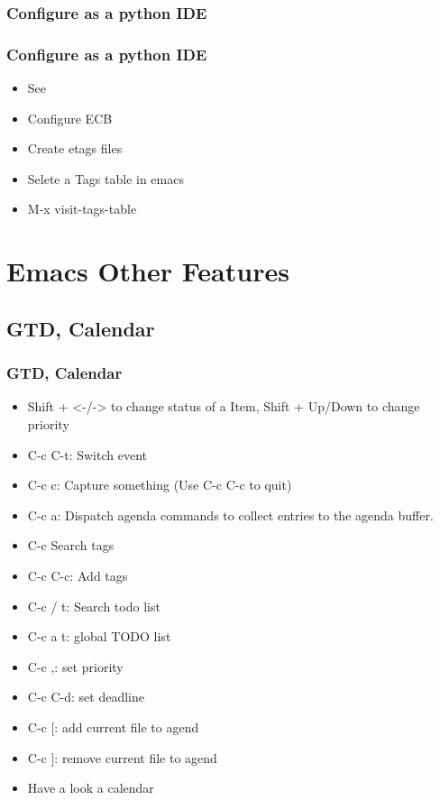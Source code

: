 \subsubsection{Configure as a python IDE}
\begin{frame}
\frametitle{Configure as a python IDE}
    \begin{itemize}
    \item See \href{http://kongll.github.io/2014/11/11/How-to-configure-emacs-as-a-Python-IDE/}{}
    \item Configure ECB
    \item Create etags files \etags
    \item Selete a Tags table in emacs
    \item M-x visit-tags-table
    \end{itemize}
\end{frame}
\section{Emacs Other Features}
\subsection{GTD, Calendar}
\begin{frame}[allowframebreaks]
\frametitle{GTD, Calendar}
    \begin{itemize}
        \item Shift + <-/-> to change status of a Item, Shift + Up/Down to change priority
        \item C-c C-t: Switch event
        \item C-c c: Capture something (Use C-c C-c to quit)
        \item C-c a: Dispatch agenda commands to collect entries to the agenda buffer.
        \item C-c \: Search tags
        \item C-c C-c: Add tags
        \item C-c / t: Search todo list
        \item C-c a t: global TODO list
        \item C-c ,: set priority
        \item C-c C-d: set deadline
        \item C-c [: add current file to agend
        \item C-c ]: remove current file to agend
        \item Have a look a calendar
    \end{itemize}
\end{frame}
